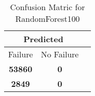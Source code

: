 \begin{table}[] 
\caption{Confusion Matric for RandomForest100} 
\label{Table: Prediction Accuracy-NoneRandomForest10099.0EKF-ignoreReflection-Reflection} 
\centering 
\begin{tabular} 
 {@{}ccc@{}} 
\toprule 
\multicolumn{2}{c}{\textbf{Predicted}}
 \\ \midrule 
\multicolumn{1}{|c|}{Failure} & 
\multicolumn{1}{c|}{No Failure}
 \\ \midrule 
\multicolumn{1}{|c|}{\color{green}\textbf{53860}} & 
\multicolumn{1}{c|}{\color{green}\textbf{0}}
 \\ \midrule 
\multicolumn{1}{|c|}{\color{red}\textbf{2849}} & 
\multicolumn{1}{c|}{\color{green}\textbf{0}}
 \\ \bottomrule 
\end{tabular} 
\end{table} 
